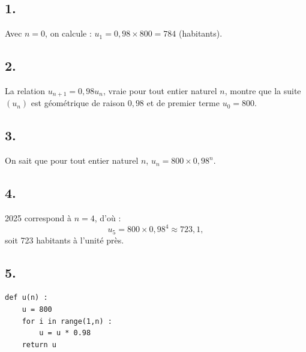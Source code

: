 \subsection*{1.}

Avec \(n = 0\), on calcule : \(u_1 = 0{,}98 \times 800 = 784\) (habitants).

\subsection*{2.}

La relation \(u_{n+1} = 0{,}98 u_n\), vraie pour tout entier naturel \(n\), montre que la suite \((u_n)\) est géométrique de raison \(0{,}98\) et de premier terme \(u_0 = 800\).

\subsection*{3.}

On sait que pour tout entier naturel \(n\), \(u_n = 800 \times 0{,}98^n\).

\subsection*{4.}

2025 correspond à \(n = 4\), d'où :
\[
u_5 = 800 \times 0{,}98^4 \approx 723{,}1,
\]
soit 723 habitants à l'unité près.

\subsection*{5.}

\begin{lstlisting}[style=python]
def u(n) :	
	u = 800
	for i in range(1,n) :
		u = u * 0.98
	return u
\end{lstlisting}
